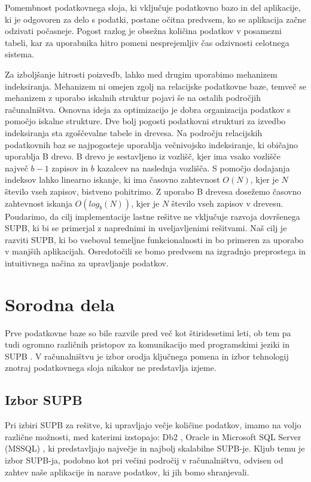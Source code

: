 \documentclass[a4paper,12pt,openright]{book}
\begin{document}
    Pomembnost podatkovnega sloja, ki vključuje podatkovno bazo in del aplikacije, ki je odgovoren za delo s podatki, postane očitna predvsem, ko se aplikacija začne odzivati počasneje. Pogost razlog je obsežna količina podatkov v posamezni tabeli, kar za uporabnika hitro pomeni nesprejemljiv čas odzivnosti celotnega sistema.

    Za izboljšanje hitrosti poizvedb, lahko med drugim uporabimo mehanizem indeksiranja. Mehanizem ni omejen zgolj na relacijske podatkovne baze, temveč se mehanizem z uporabo iskalnih struktur pojavi še na ostalih področjih računalništva. Osnovna ideja za optimizacijo je dobra organizacija podatkov s pomočjo iskalne strukture. Dve bolj pogosti podatkovni strukturi za izvedbo indeksiranja sta zgoščevalne tabele in drevesa. Na področju relacijskih podatkovnih baz se najpogosteje uporablja večnivojsko indeksiranje, ki običajno uporablja B drevo. B drevo je sestavljeno iz vozlišč, kjer ima vsako vozlišče največ $b - 1$ zapisov in $b$ kazalcev na naslednja vozlišča. S pomočjo dodajanja indeksov lahko linearno iskanje, ki ima časovno zahtevnost $O(N)$, kjer je $N$ število vseh zapisov, bistveno pohitrimo. Z uporabo B drevesa dosežemo časovno zahtevnost iskanja $O(log_b(N))$, kjer je $N$ število vseh zapisov v drevesu.
    \newline
    \newline
    \noindent
    Poudarimo, da cilj implementacije lastne rešitve ne vključuje razvoja dovršenega SUPB, ki bi se primerjal z naprednimi in uveljavljenimi rešitvami. Naš cilj je razviti SUPB, ki bo vseboval temeljne funkcionalnosti in bo primeren za uporabo v manjših aplikacijah. Osredotočili se bomo predvsem na izgradnjo preprostega in intuitivnega načina za upravljanje podatkov.

\chapter{Sorodna dela}

    Prve podatkovne baze so bile razvile pred več kot štiridesetimi leti, ob tem pa tudi ogromno različnih pristopov za komunikacijo med programskimi jeziki in SUPB \cite{bachman-09}. V računalništvu je izbor orodja ključnega pomena in izbor tehnologij znotraj podatkovnega sloja nikakor ne predstavlja izjeme.

    \section{Izbor SUPB}
    Pri izbiri SUPB za rešitve, ki upravljajo večje količine podatkov, imamo na voljo različne možnosti, med katerimi izstopajo: Db2 \cite{DB2}, Oracle \cite{ORACLE} in Microsoft SQL Server (MSSQL) \cite{MSSQL}, ki predstavljajo največje in najbolj skalabilne SUPB-je. Kljub temu je izbor SUPB-ja, podobno kot pri večini področij v računalništvu, odvisen od zahtev naše aplikacije in narave podatkov, ki jih bomo shranjevali.
\end{document}
